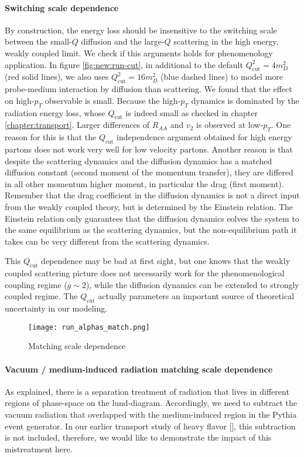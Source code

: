 \paragraph{Switching scale dependence} By construction, the energy loss should be insensitive to the switching scale between the small-$Q$ diffusion and the large-$Q$ scattering in the high energy, weakly coupled limit.
We check if this arguments holds for phenomenology application.
In figure \ref{fig:new:run-cut}, in additional to the default $Q_\textrm{cut}^2 = 4 m_D^2$ (red solid lines), we also uses $Q_\textrm{cut}^2 = 16 m_D^2$ (blue dashed lines) to model more probe-medium interaction by diffusion than scattering.
We found that the effect on high-$p_T$ observable is small.
Because the high-$p_T$ dynamics is dominated by the radiation energy loss, whose $Q_\textrm{cut}$ is indeed small as checked in chapter \ref{chapter:transport}.
Larger differences of $R_{AA}$ and $v_2$ is observed at low-$p_T$.
One reason for this is that the $Q_\textrm{cut}$ independence argument obtained for high energy partons does not work very well for low velocity partons.
Another reason is that despite the scattering dynamics and the diffusion dynamics has a matched diffusion constant (second moment of the momentum transfer), they are differed in all other momentum higher moment, in particular the drag (first moment).
Remember that the drag coefficient in the diffusion dynamics is not a direct input from the weakly coupled theory, but is determined by the Einstein relation.
The Einstein relation only guarantees that the diffusion dynamics eolves the system to the same equilibrium as the scattering dynamics, but the non-equilibrium path it takes can be very different from the scattering dynamics.

This $Q_\textrm{cut}$ dependence may be bad at first sight, but one knows that the weakly coupled scattering picture does not necessarily work for the phenomenological coupling regime ($g\sim 2$), while the diffusion dynamics can be extended to strongly coupled regime.
The $Q_\textrm{cut}$ actually parameters an important source of theoretical uncertainty in our modeling.

\begin{figure}
\centering
\texttt{[image: run\_alphas\_match.png]}
\caption{Matching scale dependence}
\label{fig:new:run-match}
\end{figure}

\paragraph{Vacuum / medium-induced radiation matching scale dependence}
As explained, there is a separation treatment of radiation that lives in different regions of phase-space on the lund-diagram.
Accordingly, we need to subtract the vacuum radiation that overlapped with the medium-induced region in the Pythia event generator.
In our earlier transport study of heavy flavor [], this subtraction is not included, therefore, we would like to demonstrate the impact of this mistreatment here.

